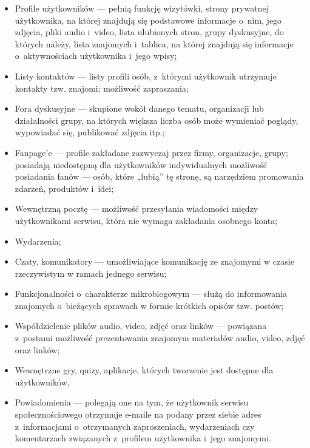 \begin{itemize}
\item Profile użytkowników --- pełnią funkcję wizytówki, strony prywatnej użytkownika, na której znajdują się podstawowe informacje o~nim, jego zdjęcia, pliki audio i~video, lista ulubionych stron, grupy dyskusyjne, do których należy, lista znajomych i~tablica, na której znajdują się informacje o~aktywnościach użytkownika i~jego wpisy;

\item Listy kontaktów --- listy profili osób, z~którymi użytkownik utrzymuje kontakty tzw. znajomi; możliwość zapraszania;

\item Fora dyskusyjne --- skupione wokół danego tematu, organizacji lub działalności grupy, na których większa liczba osób może wymieniać poglądy, wypowiadać się, publikować zdjęcia itp.;

\item Fanpage’e --- profile zakładane zazwyczaj przez firmy, organizacje, grupy; posiadają              niedostępną dla użytkowników indywidualnych możliwość posiadania fanów --- osób,              które „lubią” tę stronę, są narzędziem promowania zdarzeń, produktów i~idei;

\item Wewnętrzną pocztę --- możliwość przesyłania wiadomości między użytkownikami serwisu, która nie wymaga zakładania osobnego konta;

\item Wydarzenia;

\item Czaty, komunikatory --- umożliwiające komunikację ze znajomymi w czasie rzeczywistym w ramach jednego serwisu;

\item Funkcjonalności o~charakterze mikroblogowym --- służą do informowania znajomych o~bieżących sprawach w formie krótkich opisów tzw. postów;

\item Współdzielenie plików audio, video, zdjęć oraz linków --- powiązana z~postami możliwość prezentowania znajomym materiałów audio, video, zdjęć oraz linków;
           
\item Wewnętrzne gry, quizy, aplikacje, których tworzenie jest dostępne dla użytkowników,

\item Powiadomienia --- polegają one na tym, że użytkownik serwisu społecznościowego otrzymuje e-maile na podany przez siebie adres z~informacjami o~otrzymanych             zaproszeniach, wydarzeniach czy komentarzach związanych z~profilem użytkownika i~jego znajomymi.
\end{itemize}

